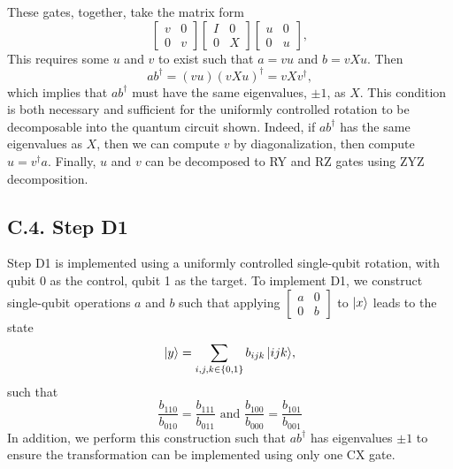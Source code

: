 These gates, together, take the matrix form
\begin{equation}
\begin{bmatrix}v&0\\0&v\end{bmatrix}
\begin{bmatrix}I&0\\0&X\end{bmatrix}
\begin{bmatrix}u&0\\0&u\end{bmatrix},
\end{equation}
This requires some $u$ and $v$ to exist such that $a = vu$ and $b = vXu$. Then
\begin{equation}
ab^\dagger = (vu)(vXu)^\dagger = vXv^\dagger,
\end{equation}
which implies that $ab^\dagger$ must have the same eigenvalues, $\pm 1$, as $X$.
This condition is both necessary and sufficient for the uniformly controlled rotation
to be decomposable into the quantum circuit shown. Indeed, if $ab^\dagger$ has the
same eigenvalues as $X$, then we can compute $v$ by diagonalization, then compute
$u = v^\dagger a$. Finally, $u$ and $v$ can be decomposed to RY and RZ gates using
ZYZ decomposition.

\subsection*{C.4. Step D1}
Step D1 is implemented using a uniformly controlled single-qubit rotation, with
qubit 0 as the control, qubit 1 as the target. To implement D1, we construct
single-qubit operations $a$ and $b$ such that applying
$\begin{bmatrix}a&0\\0&b\end{bmatrix}$ to $\mathinner{|{x}\rangle}$ leads to the state
\begin{equation}
\mathinner{|{y}\rangle} = \sum_{i, j, k \in \{0, 1\}}{b_{ijk}\mathinner{|{ijk}\rangle}},
\end{equation}
such that
\begin{equation}
\frac{b_{110}}{b_{010}} = \frac{b_{111}}{b_{011}} 
  \text{ and } \frac{b_{100}}{b_{000}} = \frac{b_{101}}{b_{001}}
\end{equation}
In addition, we perform this construction such that $ab^\dagger$ has eigenvalues
$\pm 1$ to ensure the transformation can be implemented using only one CX gate.


